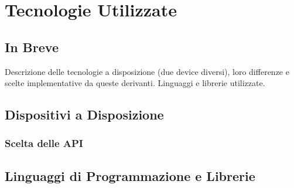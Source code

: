 \chapter{Tecnologie Utilizzate}

\section{In Breve}
Descrizione delle tecnologie a disposizione (due device diversi), loro differenze e scelte implementative da queste derivanti. Linguaggi e librerie utilizzate. 

\section{Dispositivi a Disposizione}
\subsection{Scelta delle API}
\section{Linguaggi di Programmazione e Librerie}